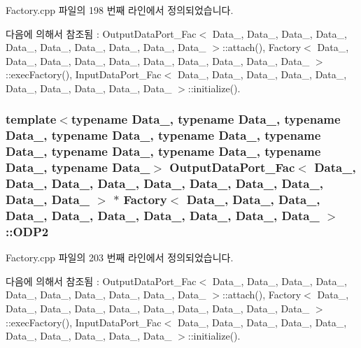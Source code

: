 Factory.\+cpp 파일의 198 번째 라인에서 정의되었습니다.



다음에 의해서 참조됨 \+:  Output\+Data\+Port\+\_\+\+Fac$<$ Data\+\_, Data\+\_, Data\+\_, Data\+\_, Data\+\_, Data\+\_, Data\+\_, Data\+\_, Data\+\_, Data\+\_ $>$\+::attach(), Factory$<$ Data\+\_, Data\+\_, Data\+\_, Data\+\_, Data\+\_, Data\+\_, Data\+\_, Data\+\_, Data\+\_, Data\+\_ $>$\+::exec\+Factory(), Input\+Data\+Port\+\_\+\+Fac$<$ Data\+\_, Data\+\_, Data\+\_, Data\+\_, Data\+\_, Data\+\_, Data\+\_, Data\+\_, Data\+\_, Data\+\_ $>$\+::initialize().

\subsubsection[{\texorpdfstring{O\+D\+P2}{ODP2}}]{\setlength{\rightskip}{0pt plus 5cm}template$<$typename Data\+\_, typename Data\+\_, typename Data\+\_, typename Data\+\_, typename Data\+\_, typename Data\+\_, typename Data\+\_, typename Data\+\_, typename Data\+\_, typename Data\+\_$>$ {\bf Output\+Data\+Port\+\_\+\+Fac}$<$ Data\+\_, Data\+\_, Data\+\_, Data\+\_, Data\+\_, Data\+\_, Data\+\_, Data\+\_, Data\+\_, Data\+\_ $>$ $\ast$ {\bf Factory}$<$ Data\+\_, Data\+\_, Data\+\_, Data\+\_, Data\+\_, Data\+\_, Data\+\_, Data\+\_, Data\+\_, Data\+\_ $>$\+::O\+D\+P2}\hypertarget{classFactory_a1a6a173fb03250b269320d772fb0855a}{}\label{classFactory_a1a6a173fb03250b269320d772fb0855a}


Factory.\+cpp 파일의 203 번째 라인에서 정의되었습니다.



다음에 의해서 참조됨 \+:  Output\+Data\+Port\+\_\+\+Fac$<$ Data\+\_, Data\+\_, Data\+\_, Data\+\_, Data\+\_, Data\+\_, Data\+\_, Data\+\_, Data\+\_, Data\+\_ $>$\+::attach(), Factory$<$ Data\+\_, Data\+\_, Data\+\_, Data\+\_, Data\+\_, Data\+\_, Data\+\_, Data\+\_, Data\+\_, Data\+\_ $>$\+::exec\+Factory(), Input\+Data\+Port\+\_\+\+Fac$<$ Data\+\_, Data\+\_, Data\+\_, Data\+\_, Data\+\_, Data\+\_, Data\+\_, Data\+\_, Data\+\_, Data\+\_ $>$\+::initialize().

